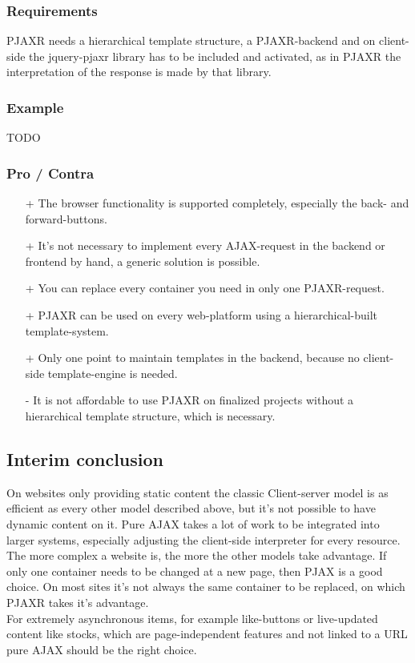 \documentclass[f,bachelor,binding,twoside,palatino]{WeSTthesis}
\begin{document}
    \subsubsection{Requirements}
    \gls{PJAXR} needs a hierarchical template structure, a \gls{PJAXR}-backend and on client-side the jquery-pjaxr library has to be included and activated, as in \gls{PJAXR} the interpretation of the response is made by that library.

    \subsubsection{Example}
    TODO
      
    \subsubsection{Pro / Contra}
      \begin{itemize}
  	    \item[+]{The browser functionality is supported completely, especially the back- and forward-buttons.}
  	    \item[+]{It's not necessary to implement every \gls{AJAX}-request in the backend or  frontend by hand, a generic solution is possible.}
  	    \item[+]{You can replace every container you need in only one \gls{PJAXR}-request.}
  	    \item[+]{\gls{PJAXR} can be used on every web-platform using a hierarchical-built template-system.}
  	    \item[+]{Only one point to maintain templates in the backend, because no client-side template-engine is needed.}
        \item[-]{It is not affordable to use \gls{PJAXR} on finalized projects without a hierarchical template structure, which is necessary.}
      \end{itemize}


  \subsection{Interim conclusion}
  On websites only providing static content the classic Client-server model is as efficient as every other model described above, but it's not possible to have dynamic content on it.
  Pure \gls{AJAX} takes a lot of work to be integrated into larger systems, especially adjusting the client-side interpreter for every resource.
  The more complex a website is, the more the other models take advantage.
  If only one container needs to be changed at a new page, then \gls{PJAX} is a good choice.
  On most sites it's not always the same container to be replaced, on which \gls{PJAXR} takes it's advantage.\\
  For extremely asynchronous items, for example like-buttons or live-updated content like stocks, which are page-independent features and not linked to a URL pure \gls{AJAX} should be the right choice.
\end{document}
